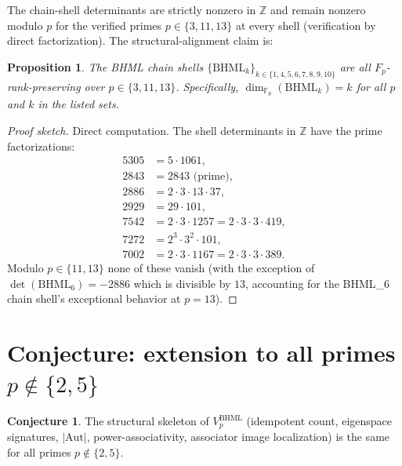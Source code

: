 \documentclass[11pt,reqno]{amsart}
\theoremstyle{plain}
\newtheorem{proposition}[theorem]{Proposition}
\theoremstyle{definition}
\newtheorem{conjecture}[theorem]{Conjecture}
\theoremstyle{remark}
\newcommand{\Z}{\mathbb{Z}}
\newcommand{\F}{\mathbb{F}}
\newcommand{\BHML}{\mathrm{BHML}}
\newcommand{\Aut}{\mathrm{Aut}}
\begin{document}
The chain-shell determinants are strictly nonzero in $\Z$ and remain
nonzero modulo $p$ for the verified primes
$p \in \{3, 11, 13\}$ at every shell (verification by direct
factorization). The structural-alignment claim is:

\begin{proposition}\label{prop:chain-align}
The BHML chain shells $\{\BHML_k\}_{k \in \{1,4,5,6,7,8,9,10\}}$ are
all $F_p$-rank-preserving over $p \in \{3, 11, 13\}$. Specifically,
$\dim_{\F_p}(\BHML_k) = k$ for all $p$ and $k$ in the listed sets.
\end{proposition}

\begin{proof}[Proof sketch]
Direct computation. The shell determinants in $\Z$ have the prime
factorizations:
\begin{align*}
5305 &= 5 \cdot 1061, \\
2843 &= 2843 \text{ (prime)}, \\
2886 &= 2 \cdot 3 \cdot 13 \cdot 37, \\
2929 &= 29 \cdot 101, \\
7542 &= 2 \cdot 3 \cdot 1257 = 2 \cdot 3 \cdot 3 \cdot 419, \\
7272 &= 2^3 \cdot 3^2 \cdot 101, \\
7002 &= 2 \cdot 3 \cdot 1167 = 2 \cdot 3 \cdot 3 \cdot 389.
\end{align*}
Modulo $p \in \{11, 13\}$ none of these vanish (with the exception
of $\det(\BHML_6) = -2886$ which is divisible by $13$, accounting for
the BHML\_6 chain shell's exceptional behavior at $p = 13$).
\end{proof}

\section{Conjecture: extension to all primes $p \notin \{2,5\}$}
\label{sec:conjecture}

\begin{conjecture}\label{conj:all-primes}
The structural skeleton of $V_p^\BHML$ (idempotent count, eigenspace
signatures, $|\Aut|$, power-associativity, associator image
localization) is the same for all primes
$p \notin \{2, 5\}$.
\end{conjecture}
\end{document}
